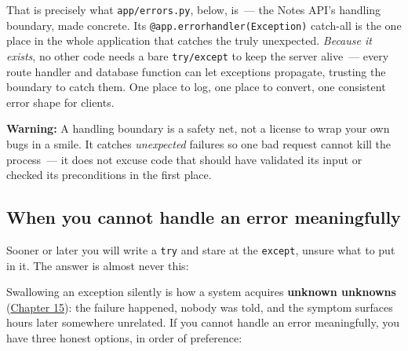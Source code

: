 That is precisely what \texttt{app/errors.py}, below, is~--- the Notes API's handling boundary, made concrete. Its \texttt{@app.}\allowbreak{}\texttt{errorhandler(Exception)} catch-all is the one place in the whole application that catches the truly unexpected. \emph{Because it exists}, no other code needs a bare \texttt{try/except} to keep the server alive~--- every route handler and database function can let exceptions propagate, trusting the boundary to catch them. One place to log, one place to convert, one consistent error shape for clients.

\begin{warnbox}

\textbf{Warning:} A handling boundary is a safety net, not a license to wrap your own bugs in a smile. It catches \emph{unexpected} failures so one bad request cannot kill the process~--- it does not excuse code that should have validated its input or checked its preconditions in the first place.

\end{warnbox}

\subsection*{When you cannot handle an error meaningfully}\label{16-logging-error-handling:when-you-cannot-handle-an-error-meaningfully}

Sooner or later you will write a \texttt{try} and stare at the \texttt{except}, unsure what to put in it. The answer is almost never this:

\begin{codebox}[short]

\begin{Shaded}
\begin{Highlighting}[]
\NormalTok{:}
 \NormalTok{:}
              
\end{Highlighting}
\end{Shaded}

\end{codebox}

\noindent{}Swallowing an exception silently is how a system acquires \textbf{unknown unknowns} (\hyperref[ch:15-structuring-the-application]{Chapter 15}): the failure happened, nobody was told, and the symptom surfaces hours later somewhere unrelated. If you cannot handle an error meaningfully, you have three honest options, in order of preference:

